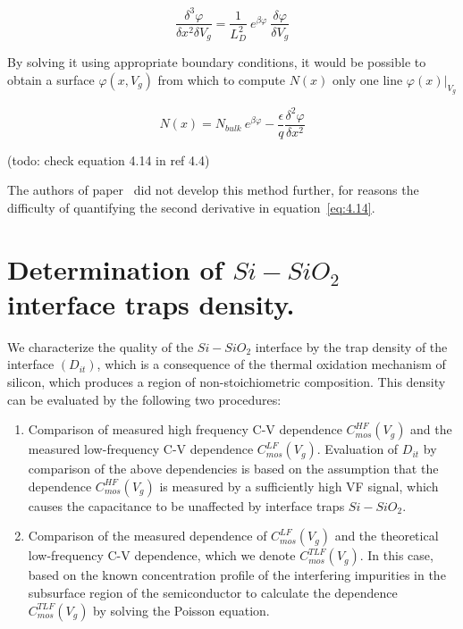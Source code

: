 \begin{equation}\label{eq:4.13}
  \frac{\delta^{3}\varphi}{\delta x^{2}\delta V_{g}} = {\frac{1}{L_{D}^{2}}}\ {e^{\beta\varphi}}\ {\frac{\delta\varphi}{\delta V_{g}}}
\end{equation}

By solving it using appropriate boundary conditions, it would be
possible to obtain a surface $\varphi(x,V_{g})$ from which to compute
$N(x)$ only one line $\varphi(x)\rvert_{V_{g}}$

\begin{equation}\label{eq:4.14}
  N(x) = N_{bulk}\ e^{\beta\varphi}-\frac{\epsilon}{q}\frac{\delta^{2}\varphi}{\delta x^{2}}
\end{equation}

(todo: check equation 4.14 in ref 4.4)

The authors of paper~\cite{4.4} did not develop this method further,
for reasons the difficulty of quantifying the second derivative in
equation~\ref{eq:4.14}.


\section{Determination of $Si-SiO_{2}$ interface traps density.}\label{sec:4.2}

We characterize the quality of the $Si-SiO_{2}$ interface by the trap
density of the interface $(D_{it})$, which is a consequence of the
thermal oxidation mechanism of silicon, which produces a region of
non-stoichiometric composition. This density can be evaluated by the
following two procedures:

\begin{enumerate}
\item Comparison of measured high frequency C-V dependence
  $C_{mos}^{HF}(V_{g})$ and the measured low-frequency C-V dependence
  $C_{mos}^{LF}(V_{g})$. Evaluation of $D_{it}$ by comparison of the
  above dependencies is based on the assumption that the dependence
  $C_{mos}^{HF}(V_{g})$ is measured by a sufficiently high VF signal,
  which causes the capacitance to be unaffected by interface traps
  $Si-SiO_{2}$.
\item Comparison of the measured dependence of $C_{mos}^{LF}(V_{g})$
  and the theoretical low-frequency C-V dependence, which we denote
  $C_{mos}^{TLF}(V_{g})$.  In this case, based on the known
  concentration profile of the interfering impurities in the
  subsurface region of the semiconductor to calculate the dependence
  $C_{mos}^{TLF}(V_{g})$ by solving the Poisson equation.
\end{enumerate}

